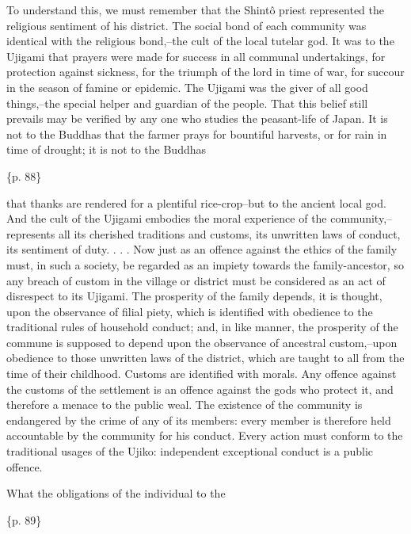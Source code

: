 To understand this, we must remember that the Shintô priest represented the religious sentiment of his district. The social bond of each community was identical with the religious bond,--the cult of the local tutelar god. It was to the Ujigami that prayers were made for success in all communal undertakings, for protection against sickness, for the triumph of the lord in time of war, for succour in the season of famine or epidemic. The Ujigami was the giver of all good things,--the special helper and guardian of the people. That this belief still prevails may be verified by any one who studies the peasant-life of Japan. It is not to the Buddhas that the farmer prays for bountiful harvests, or for rain in time of drought; it is not to the Buddhas

\{p. 88\}

that thanks are rendered for a plentiful rice-crop--but to the ancient local god. And the cult of the Ujigami embodies the moral experience of the community,--represents all its cherished traditions and customs, its unwritten laws of conduct, its sentiment of duty. . . . Now just as an offence against the ethics of the family must, in such a society, be regarded as an impiety towards the family-ancestor, so any breach of custom in the village or district must be considered as an act of disrespect to its Ujigami. The prosperity of the family depends, it is thought, upon the observance of filial piety, which is identified with obedience to the traditional rules of household conduct; and, in like manner, the prosperity of the commune is supposed to depend upon the observance of ancestral custom,--upon obedience to those unwritten laws of the district, which are taught to all from the time of their childhood. Customs are identified with morals. Any offence against the customs of the settlement is an offence against the gods who protect it, and therefore a menace to the public weal. The existence of the community is endangered by the crime of any of its members: every member is therefore held accountable by the community for his conduct. Every action must conform to the traditional usages of the Ujiko: independent exceptional conduct is a public offence.

What the obligations of the individual to the

\{p. 89\}


